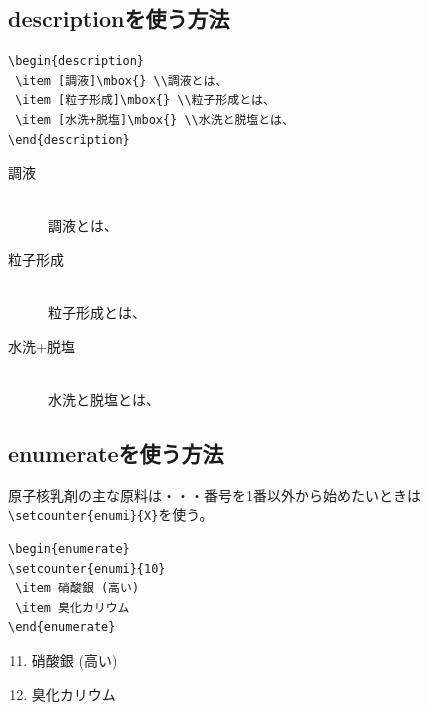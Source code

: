 \documentclass[a4j]{jsarticle}
\begin{document}
\subsection{descriptionを使う方法}
\begin{verbatim}
\begin{description}
 \item [調液]\mbox{} \\調液とは、
 \item [粒子形成]\mbox{} \\粒子形成とは、
 \item [水洗+脱塩]\mbox{} \\水洗と脱塩とは、
\end{description}
\end{verbatim}
\begin{description}
 \item [調液]\mbox{} \\調液とは、
 \item [粒子形成]\mbox{} \\粒子形成とは、
 \item [水洗+脱塩]\mbox{} \\水洗と脱塩とは、
\end{description}
\subsection{enumerateを使う方法}
原子核乳剤の主な原料は・・・番号を1番以外から始めたいときは\verb|\setcounter{enumi}{X}|を使う。
\begin{verbatim}
\begin{enumerate}
\setcounter{enumi}{10}
 \item 硝酸銀 (高い)
 \item 臭化カリウム
\end{enumerate}
\end{verbatim}
\begin{enumerate}
\setcounter{enumi}{10}
 \item 硝酸銀 (高い)
 \item 臭化カリウム
\end{enumerate}
\newpage
\end{document}
